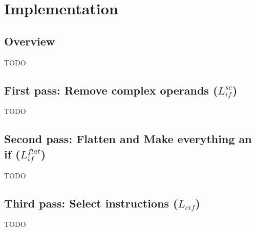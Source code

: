 \section{Implementation}

\subsection{Overview}

TODO

\subsection{First pass: Remove complex operands ($L_{if}^{sc}$)}

TODO

\subsection{Second pass: Flatten and Make everything an if ($L_{if}^{flat}$)}

TODO

\subsection{Third pass: Select instructions ($L_{cif}$)}

TODO

